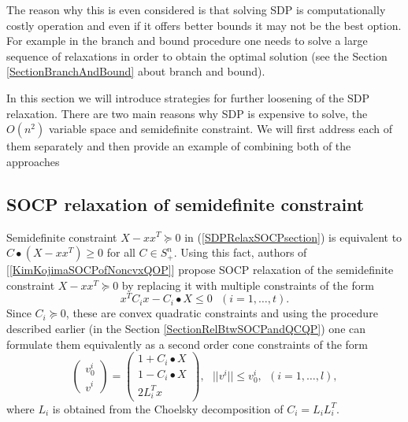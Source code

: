 \documentclass[12pt]{book}
\theoremstyle{definition}
\begin{document}
The reason why this is even considered is that solving SDP is computationally costly operation and even if it offers better bounds it may not be the best option. For example in the branch and bound procedure one needs to solve a large sequence of relaxations in order to obtain the optimal solution (see the Section \ref{SectionBranchAndBound} about branch and bound).

In this section we will introduce strategies for further loosening of the SDP relaxation. There are two main reasons why SDP is expensive to solve, the $O(n^2)$ variable space and semidefinite constraint. We will first address each of them separately and then provide an example of combining both of the approaches

\subsection{SOCP relaxation of semidefinite constraint}

Semidefinite constraint $X-xx^T\succeq 0$  in (\ref{SDPRelaxSOCPsection}) is equivalent to $C\bullet(X-xx^T)\geq 0$ for all $C\in S^n_+$. Using this fact, authors of  [\ref{KimKojimaSOCPofNoncvxQOP}] propose SOCP relaxation of the semidefinite constraint $X-xx^T\succeq 0$ by replacing it with multiple constraints of the form 
$$x^TC_ix-C_i\bullet X \leq 0 \ \ \ (i=1,\dots ,t).$$ 
Since $C_i\succeq 0$, these are convex quadratic constraints and using the procedure described earlier (in the Section \ref{SectionRelBtwSOCPandQCQP}) one can formulate them equivalently as a second order cone constraints of the form
\begin{equation}
\label{SOCPRelaxOfPSDconstraint}
\left(\begin{array}{c}
v^i_0\\
v^i
\end{array}\right)
= \left(\begin{array}{c}
1+C_i\bullet X\\
1-C_i\bullet X \\
2L_i^Tx
\end{array}\right), \ \ \ ||v^i||\leq v^i_0, \ \ (i  = 1,\dots ,l),
\end{equation}
where $L_i$ is obtained from the Choelsky decomposition of $C_i = L_iL_i^T.$
\end{document}
